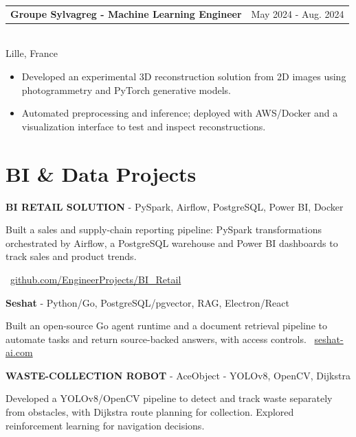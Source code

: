 \documentclass[10pt,a4paper]{article}
\makeatletter
\newcommand{\role}[3]{%
  \vspace{3pt}
  \begin{tabularx}{\linewidth}{@{}Xr@{}}
  \textbf{#1} & {\color{muted}#2}
  \end{tabularx}\vspace{0.8pt}\\
  {\color{muted}#3}\par
  \vspace{3pt}
}
\newcommand{\projectline}[2]{\textbf{#1} - #2\par}
\newcommand{\githublink}[2]{\par{\footnotesize\color{accent}\faIcon{github}\ \href{#1}{#2}}\par}
\newlength{\maincolumnheight}
\makeatother
\begin{document}
\begin{lrbox}{\maincolumnbox}
\begin{minipage}[t]{0.695\textwidth}
\vspace{8pt}
\role{Groupe Sylvagreg - Machine Learning Engineer}{May 2024 - Aug. 2024}{Lille, France}
\begin{itemize}
  \item Developed an experimental 3D reconstruction solution from 2D images using photogrammetry and PyTorch generative models.
  \item Automated preprocessing and inference; deployed with AWS/Docker and a visualization interface to test and inspect reconstructions.
\end{itemize}

\section{BI \& Data Projects}
\projectline{BI RETAIL SOLUTION}{PySpark, Airflow, PostgreSQL, Power BI, Docker}
Built a sales and supply-chain reporting pipeline: PySpark transformations orchestrated by Airflow, a PostgreSQL warehouse and Power BI dashboards to track sales and product trends.
\githublink{https://github.com/EngineerProjects/BI_Retail}{github.com/EngineerProjects/BI\_Retail}

\vspace{7pt}
\projectline{Seshat}{Python/Go, PostgreSQL/pgvector, RAG, Electron/React}
Built an open-source Go agent runtime and a document retrieval pipeline to automate tasks and return source-backed answers, with access controls.
{\footnotesize\color{accent}\ \href{https://seshat-ai.com}{seshat-ai.com}}\par

\vspace{7pt}
\projectline{WASTE-COLLECTION ROBOT}{AceObject - YOLOv8, OpenCV, Dijkstra}
Developed a YOLOv8/OpenCV pipeline to detect and track waste separately from obstacles, with Dijkstra route planning for collection. Explored reinforcement learning for navigation decisions.

\end{minipage}
\end{lrbox}
\setlength{\maincolumnheight}{\dimexpr\ht\maincolumnbox+\dp\maincolumnbox\relax}
\addtolength{\maincolumnheight}{45pt}
\end{document}
